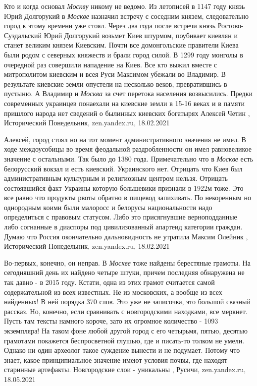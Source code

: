 Кто и когда основал \emph{Москву} никому не ведомо. Из летописей в 1147 году
князь Юрий Долгорукий в \emph{Москве} назначил встречу с соседним князем,
следовательно город к этому времени уже стоял. Через два года после встречи
князь Ростово-Суздальский Юрий Долгорукий возьмет Киев штурмом, поубивает
киевлян и станет великим князем Киевским. Почти все домонгольские правители
Киева были родом с северных княжеств и брали город силой.  В 1299 году монголы
в очередной раз совершили нападение на Киев. Все кто выжил вместе с
митрополитом киевским и всея Руси Максимом убежали во Владимир. В результате
киевские земли опустели на несколько веков, превратившись в пустыню.  А
Владимир и \emph{Москва} за счет перетока населения возвысились. Предки современных
украинцев понаехали на киевские земли в 15-16 веках и в памяти пришлого народа
нет сведений о былинных киевских богатырях
Алексей Четин
, 
Исторический Понедельник, zen.yandex.ru, 18.02.2021

Алексей, город стоял но на тот момент административного значения не имел. В
ходе междоусобицы во время феодальной раздробленности он имел равновеликое
значение с остальными. Так было до 1380 года. Примечательно что в \emph{Москве}
есть белорусский вокзал и есть киевский. Украинского нет. Отрицать что Киев был
административным культурным и религиозным центром нельзя. Отрицать состоявшийся
факт Украины которую большевики признали в 1922м тоже. Это все равно что
продукты рвоты обратно в пищевод запихивать. По некоренным но однородным коими
были малоросс и белорусы национальности надо определиться с правовым статусом.
Либо это присягнувшие верноподданные либо согнанные в диаспоры под
цивилизованный апартеид категории граждан. Думаю что Россия окончательно
дальновидность не утратила
Максим Олейник
, 
Исторический Понедельник, zen.yandex.ru, 18.02.2021

Во-первых, конечно, он неправ. В \emph{Москве} тоже найдены берестяные грамоты.
На сегодняшний день их найдено четыре штуки, причем последняя обнаружена не так
давно - в 2015 году.  Кстати, одна из этих грамот считается самой
содержательной из всех известных. Не из московских, а вообще из всех найденных!
В ней порядка 370 слов. Это уже не записочка, это большой связный рассказ.  Но,
конечно, если сравнивать с новгородскими находками, все меркнет. Пусть там
тексты намного короче, зато их огромное количество - 1093 экземпляра! На таком
фоне любой другой город с его четырьмя, пятью, десятью грамотами покажется
беспросветной глушью, где и писать-то толком не умели.  Однако ни один археолог
такое суждение вынести и не подумает. Потому что знает, какое принципиальное
значение имеют условия почвы, где находят старинные артефакты. Новгородские
слои - уникальны
, 
Русичи, zen.yandex.ru, 18.05.2021

